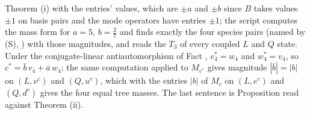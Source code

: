 Theorem (i) with the entries' values, which are $\pm a$ and $\pm b$ since $B$ takes values $\pm 1$ on basis pairs and the mode operators have entries $\pm 1$; the script computes the mass form for $a = 5$, $b = \tfrac27$ and finds exactly the four species pairs (named by (S), ) with those magnitudes, and reads the $T_{3}$ of every coupled $L$ and $Q$ state. Under the conjugate-linear antiautomorphism of Fact , $v_{4}^{*} = w_{4}$ and $w_{4}^{*} = v_{4}$, so $c^{*} = \bar{b}\,v_{4} + \bar{a}\,w_{4}$; the same computation applied to $M_{c^{*}}$ gives magnitude $|\bar{b}| = |b|$ on $(L, \nu^{c})$ and $(Q, u^{c})$, which with the entries $|b|$ of $M_{c}$ on $(L, e^{c})$ and $(Q, d^{c})$ gives the four equal tree masses. The last sentence is Proposition  read against Theorem (ii).
